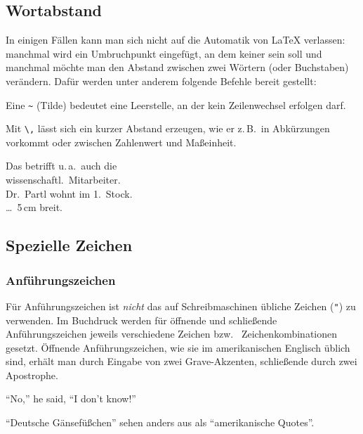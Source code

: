 

\subsection{Wortabstand} \label{abstaende}

In einigen Fällen kann man sich nicht auf die Automatik von \LaTeX{} verlassen: manchmal wird ein Umbruchpunkt eingefügt, an dem keiner sein soll und manchmal möchte man den Abstand zwischen zwei Wörtern (oder Buchstaben) verändern. Dafür werden unter anderem folgende Befehle bereit gestellt:

Eine \lstinline|~| (Tilde) bedeutet eine Leerstelle, an der kein Zeilenwechsel
erfolgen darf.

Mit \lstinline|\,| lässt sich ein kurzer Abstand erzeugen, wie er z.\,B.\ in
Abkürzungen vorkommt oder zwischen Zahlenwert und Maßeinheit.

 
\begin{LTXexample}
Das betrifft u.\,a.\ auch die \\
wissenschaftl.\ Mitarbeiter. \\
Dr.~Partl wohnt im 1.~Stock. \\
\dots\ 5\,cm breit.
\end{LTXexample}


\subsection{Spezielle Zeichen} \label{spezial}
 
\subsubsection{Anführungszeichen} \label{quotes}
 
Für Anführungszeichen ist \emph{nicht} das auf Schreibmaschinen
übliche Zeichen (\lstinline|"|) zu verwenden.
Im Buchdruck werden für öffnende und schließende
Anführungszeichen jeweils verschiedene Zeichen bzw.\ %
Zeichenkombinationen gesetzt.
Öffnende Anführungszeichen, wie sie im amerikanischen Englisch 
üblich sind, erhält man durch Eingabe von zwei Grave-Akzenten, 
schließende durch zwei Apostrophe.
\begin{LTXexample}
``No,'' he said,
``I don't know!''
\end{LTXexample}
"`Deutsche Gänsefüßchen"' sehen anders aus als ``amerikanische
Quotes''.  


